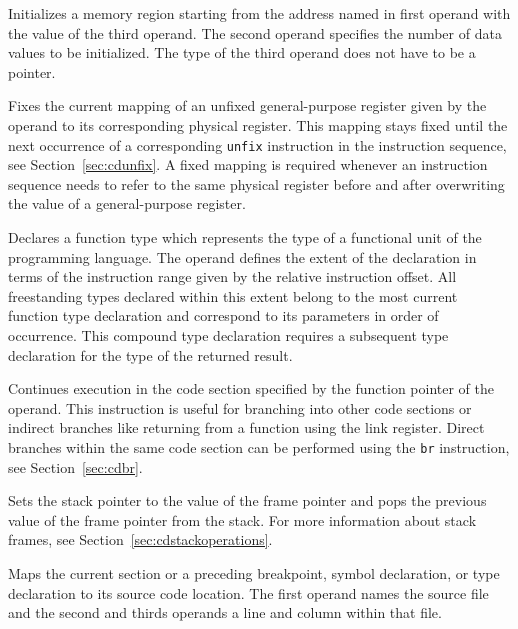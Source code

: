 
Initializes a memory region starting from the address named in first operand with the value of the third operand.
The second operand specifies the number of data values to be initialized.
The type of the third operand does not have to be a pointer.


Fixes the current mapping of an unfixed general-purpose register given by the operand to its corresponding physical register.
This mapping stays fixed until the next occurrence of a corresponding \texttt{unfix} instruction in the instruction sequence, see Section~\ref{sec:cdunfix}.
A fixed mapping is required whenever an instruction sequence needs to refer to the same physical register before and after overwriting the value of a general-purpose register.


Declares a function type which represents the type of a functional unit of the programming language.
The operand defines the extent of the declaration in terms of the instruction range given by the relative instruction offset.
All freestanding types declared within this extent belong to the most current function type declaration and correspond to its parameters in order of occurrence.
This compound type declaration requires a subsequent type declaration for the type of the returned result.


Continues execution in the code section specified by the function pointer of the operand.
This instruction is useful for branching into other code sections or indirect branches like returning from a function using the link register.
Direct branches within the same code section can be performed using the \texttt{br} instruction, see Section~\ref{sec:cdbr}.


Sets the stack pointer to the value of the frame pointer and pops the previous value of the frame pointer from the stack.
For more information about stack frames, see Section~\ref{sec:cdstackoperations}.


Maps the current section or a preceding breakpoint, symbol declaration, or type declaration to its source code location.
The first operand names the source file and the second and thirds operands a line and column within that file.

